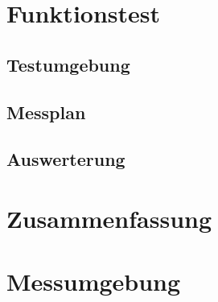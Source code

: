 \documentclass[a4paper, 11pt, toc=bibliography, toc=listof]{scrbook}
\begin{document}


	\chapter{Funktionstest} %
	\label{cha:Funktionstest}
	
		\section{Testumgebung} %
		\label{sec:Testumgebung}
			

		\section{Messplan} %
		\label{sec:Messplan}
			

		\section{Auswerterung} %
		\label{sec:Auswerterung}
			


	\chapter{Zusammenfassung} %
	\label{cha:Zusammenfassung}
	


	\appendix

	\chapter{Messumgebung} %
	\label{cha:Messumgebung}



	\backmatter

	\listoffigures{}
	\listoftables{}

	\nocite{*}
	
	

\end{document}
